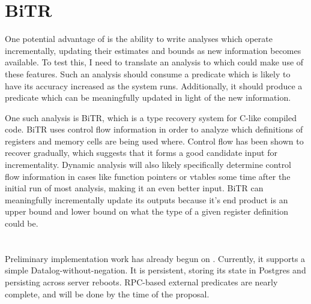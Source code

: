 \section{BiTR}
One potential advantage of \sysname is the ability to write analyses which operate incrementally, updating their estimates and bounds as new information becomes available.
To test this, I need to translate an analysis to \sysname which could make use of these features.
Such an analysis should consume a predicate which is likely to have its accuracy increased as the system runs.
Additionally, it should produce a predicate which can be meaningfully updated in light of the new information.

One such analysis is BiTR\cite{bitr}, which is a type recovery system for C-like compiled code.
BiTR uses control flow information in order to analyze which definitions of registers and memory cells are being used where.
Control flow has been shown\cite{jakstab} to recover gradually, which suggests that it forms a good candidate input for incrementality.
Dynamic analysis will also likely specifically determine control flow information in cases like function pointers or vtables some time after the initial run of most analysis, making it an even better input.
BiTR can meaningfully incrementally update its outputs because it's end product is an upper bound and lower bound on what the type of a given register definition could be.

\section{\sysname}
Preliminary implementation work has already begun on \sysname.
Currently, it supports a simple Datalog-without-negation.
It is persistent, storing its state in Postgres and persisting across server reboots.
RPC-based external predicates are nearly complete, and will be done by the time of the proposal.
